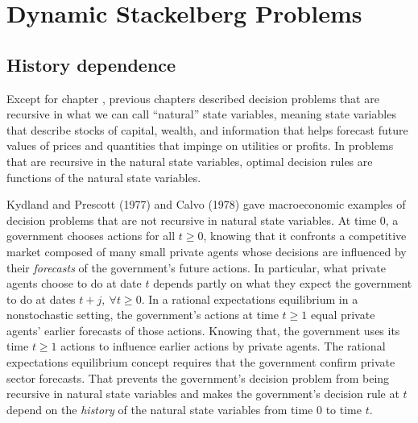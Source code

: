 

%






\def\toone{{t+1}}
\def\ttwo{{t+2}}
\def\tthree{{t+3}}
\def\Tone{{T+1}}
\def\TTT{{T-1}}
\def\rtr{{\rm tr}}

\chapter{Dynamic Stackelberg Problems\label{stackel}}

\section{History dependence}

  Except for chapter , previous chapters described decision problems that are recursive in
what we can call ``natural'' state variables, meaning state variables that
describe stocks of capital, wealth, and information that helps forecast
future values of prices and quantities that impinge on  utilities
or profits.  In problems that are recursive in the natural state variables,
optimal decision rules are functions of the natural state variables.

Kydland and Prescott (1977)  and Calvo (1978) gave
macroeconomic examples of decision problems
that %
are not  recursive in natural state variables.
At time $0$, a government
chooses  actions for all $t \geq 0$, knowing that it  confronts  a competitive market composed of many small private
agents
whose decisions are influenced by their
{\it forecasts\/} of the government's future actions. In particular, what private agents choose to do at date $t$ depends
 partly on what they expect the government  to do at dates $t+j, \ \forall t \geq 0$.   In a rational expectations equilibrium in a nonstochastic setting,
 the government's actions at time $t \geq 1$ equal private agents' earlier forecasts of
those actions.
Knowing that, the government uses its time $t \geq 1$ actions
to influence earlier actions by private agents.  The rational expectations equilibrium concept requires that the government  confirm
private sector forecasts. That
prevents the government's decision problem from being
recursive in  natural state variables and makes  the government's
decision rule at $t$ depend on the {\it history\/} of the natural
state variables from time $0$ to time $t$.

